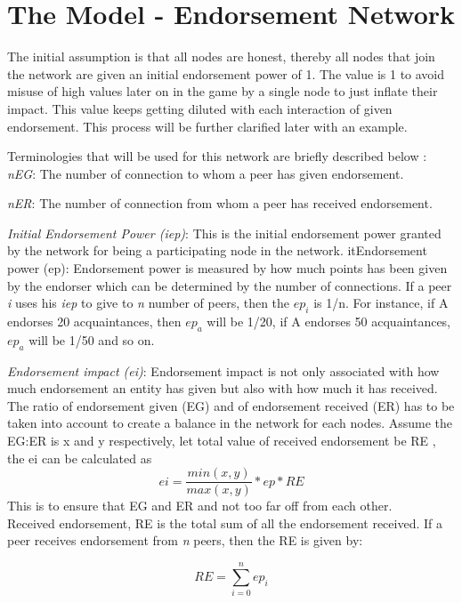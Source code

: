 \section{The Model - Endorsement Network}
The initial assumption is that all nodes are honest, thereby all nodes that join 
the network are given an initial endorsement power of 1. The value is 1 to avoid 
misuse of high values later on in the game by a single node to just inflate their 
impact. This value keeps getting diluted with each interaction of given  
endorsement. This process will be further clarified later with an example.

Terminologies that will be used for this network are briefly described below : \\
\textit{nEG}: The number of connection to whom a peer has given endorsement.

\textit{nER}: The number of connection from whom a peer has received endorsement. 


\textit{Initial Endorsement Power (iep)}: This is the initial endorsement power 
granted by the network for being a participating node in the network. 
it{Endorsement power (ep):} Endorsement power is measured by how much points 
has been given by the endorser which can be determined by the number of 
connections. If a peer \textit{i} uses his \textit{iep} to give to \textit{n} 
number of peers, then the $ep_i$ is 1/n. For instance, if A endorses 
20 acquaintances, then $ep_a$ will be 1/20, if A endorses 50 
acquaintances, $ep_a$ will be 1/50 and so on. 

\textit{Endorsement impact (ei)}: Endorsement impact is not only associated with 
how much endorsement an entity has given but also with how much it has received. 
The ratio of endorsement given (EG) and of endorsement received (ER) has to be 
taken into account to create a balance in the network for each nodes. Assume the 
EG:ER is x and y respectively, let total value of received endorsement be RE , 
the ei can be calculated as \\
\begin{equation}
	ei = \frac{min(x,y)}{max(x,y)} * ep * RE 
\end{equation}
This is to ensure that EG and ER and not too far off from each other. \\ 

Received endorsement, RE is the total sum of all the endorsement received.
If a peer receives endorsement from \textit{n} peers, then the RE is given by: 

\begin{equation}
	RE = \sum_{i=0}^{n}ep_{i}
\end{equation}

